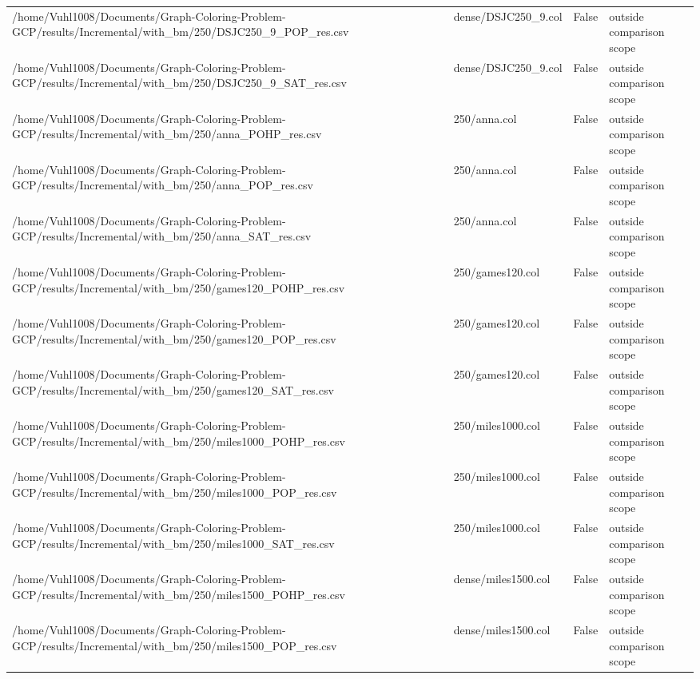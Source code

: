 \begin{table}[htbp]
\begin{tabular}{llll}
/home/Vuhl1008/Documents/Graph-Coloring-Problem-GCP/results/Incremental/with\_bm/250/DSJC250\_9\_POP\_res.csv & dense/DSJC250\_9.col & False & outside comparison scope \\
/home/Vuhl1008/Documents/Graph-Coloring-Problem-GCP/results/Incremental/with\_bm/250/DSJC250\_9\_SAT\_res.csv & dense/DSJC250\_9.col & False & outside comparison scope \\
/home/Vuhl1008/Documents/Graph-Coloring-Problem-GCP/results/Incremental/with\_bm/250/anna\_POHP\_res.csv & 250/anna.col & False & outside comparison scope \\
/home/Vuhl1008/Documents/Graph-Coloring-Problem-GCP/results/Incremental/with\_bm/250/anna\_POP\_res.csv & 250/anna.col & False & outside comparison scope \\
/home/Vuhl1008/Documents/Graph-Coloring-Problem-GCP/results/Incremental/with\_bm/250/anna\_SAT\_res.csv & 250/anna.col & False & outside comparison scope \\
/home/Vuhl1008/Documents/Graph-Coloring-Problem-GCP/results/Incremental/with\_bm/250/games120\_POHP\_res.csv & 250/games120.col & False & outside comparison scope \\
/home/Vuhl1008/Documents/Graph-Coloring-Problem-GCP/results/Incremental/with\_bm/250/games120\_POP\_res.csv & 250/games120.col & False & outside comparison scope \\
/home/Vuhl1008/Documents/Graph-Coloring-Problem-GCP/results/Incremental/with\_bm/250/games120\_SAT\_res.csv & 250/games120.col & False & outside comparison scope \\
/home/Vuhl1008/Documents/Graph-Coloring-Problem-GCP/results/Incremental/with\_bm/250/miles1000\_POHP\_res.csv & 250/miles1000.col & False & outside comparison scope \\
/home/Vuhl1008/Documents/Graph-Coloring-Problem-GCP/results/Incremental/with\_bm/250/miles1000\_POP\_res.csv & 250/miles1000.col & False & outside comparison scope \\
/home/Vuhl1008/Documents/Graph-Coloring-Problem-GCP/results/Incremental/with\_bm/250/miles1000\_SAT\_res.csv & 250/miles1000.col & False & outside comparison scope \\
/home/Vuhl1008/Documents/Graph-Coloring-Problem-GCP/results/Incremental/with\_bm/250/miles1500\_POHP\_res.csv & dense/miles1500.col & False & outside comparison scope \\
/home/Vuhl1008/Documents/Graph-Coloring-Problem-GCP/results/Incremental/with\_bm/250/miles1500\_POP\_res.csv & dense/miles1500.col & False & outside comparison scope \\

\end{tabular}
\end{table}
